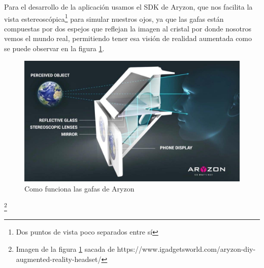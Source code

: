 Para el desarrollo de la aplicación usamos el SDK de Aryzon, que nos facilita la vista estereoscópica\footnote{ Dos puntos de vista poco separados entre sí} para simular nuestros ojos, ya que las gafas están compuestas por dos espejos que reflejan la imagen al cristal por donde nosotros vemos el mundo real, permitiendo tener esa visión de realidad aumentada como se puede observar en la figura \ref{GafasAryzon}.

\begin{figure}[H]
    \centering
    \includegraphics[width=0.75\linewidth]{Images/How-it-works.jpg}
    \caption{Como funciona las gafas de Aryzon}
    \label{GafasAryzon}
\end{figure}
 {\let\thefootnote\relax\footnote{{Imagen de la figura \ref{GafasAryzon} sacada de https://www.igadgetsworld.com/aryzon-diy-augmented-reality-headset/}}}

